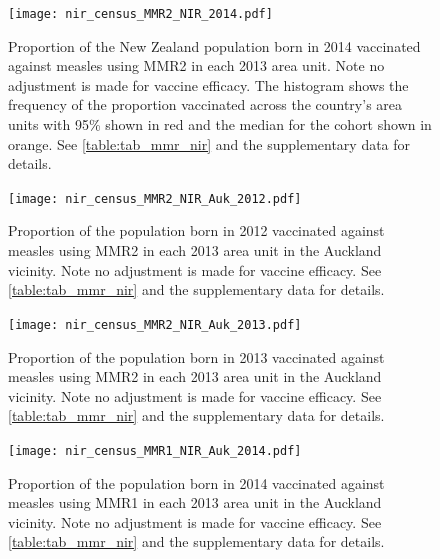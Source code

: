 \documentclass{article}
\begin{document}
\begin{figure}
\begin{center}
    \texttt{[image: nir\_census\_MMR2\_NIR\_2014.pdf]}
 \end{center}
\caption{Proportion of the New Zealand population born in 2014 vaccinated against measles using MMR2 in each 2013 area unit. Note no adjustment is made for vaccine efficacy. The histogram shows the frequency of the proportion vaccinated across the country's area units with 95\% shown in red and the median for the cohort shown in orange. See \autoref{table:tab_mmr_nir} and the supplementary data for details.}
\label{fig:fig22014}
\end{figure}


\begin{figure}
\begin{center}
    \texttt{[image: nir\_census\_MMR2\_NIR\_Auk\_2012.pdf]}
 \end{center}
    \caption{Proportion of the population born in 2012 vaccinated against measles using MMR2 in each 2013 area unit in the Auckland vicinity. Note no adjustment is made for vaccine efficacy. See \autoref{table:tab_mmr_nir} and the supplementary data for details.}
\label{fig:fig22012_a}
\end{figure}

\begin{figure}
\begin{center}
    \texttt{[image: nir\_census\_MMR2\_NIR\_Auk\_2013.pdf]}
 \end{center}
    \caption{Proportion of the population born in 2013 vaccinated against measles using MMR2 in each 2013 area unit in the Auckland vicinity. Note no adjustment is made for vaccine efficacy. See \autoref{table:tab_mmr_nir} and the supplementary data for details.}
\label{fig:fig22013_a}
\end{figure}


\begin{figure}
\begin{center}
    \texttt{[image: nir\_census\_MMR1\_NIR\_Auk\_2014.pdf]}
 \end{center}
    \caption{Proportion of the population born in 2014 vaccinated against measles using MMR1 in each 2013 area unit in the Auckland vicinity. Note no adjustment is made for vaccine efficacy. See \autoref{table:tab_mmr_nir} and the supplementary data for details.}
\label{fig:fig12014_a}
\end{figure}
\end{document}
